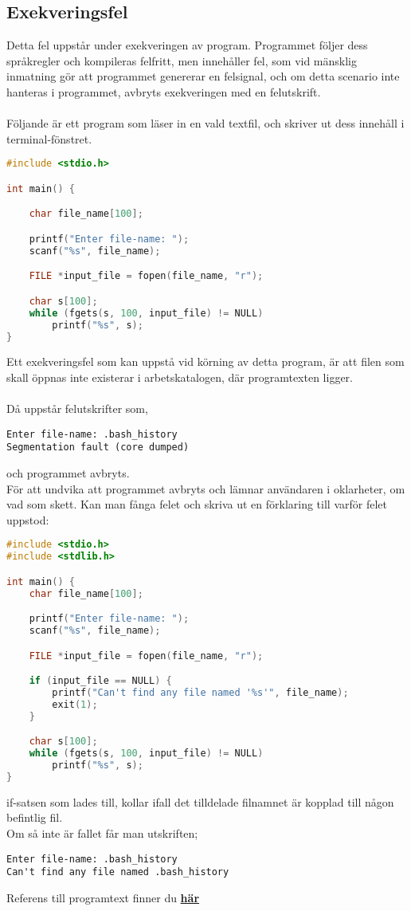 \documentclass[../main.tex]{subfiles}
\begin{document}
\subsection{Exekveringsfel}
\label{sec:c3}
Detta fel uppstår under exekveringen av program. Programmet följer dess språkregler och kompileras felfritt, men innehåller fel, som vid mänsklig inmatning gör att programmet genererar en felsignal, och om detta scenario inte hanteras i programmet, avbryts exekveringen med en felutskrift.\\
\\
Följande är ett program som läser in en vald textfil, och skriver ut dess innehåll i terminal-fönstret.
\begin{lstlisting}[language=c]
#include <stdio.h>

int main() {

    char file_name[100];

    printf("Enter file-name: ");
    scanf("%s", file_name);

    FILE *input_file = fopen(file_name, "r");

    char s[100];
    while (fgets(s, 100, input_file) != NULL)
        printf("%s", s);
}
\end{lstlisting}
Ett exekveringsfel som kan uppstå vid körning av detta program, är att filen som skall öppnas inte existerar i arbetskatalogen, där programtexten ligger.\\
\\
Då uppstår felutskrifter som,
\begin{lstlisting}
Enter file-name: .bash_history
Segmentation fault (core dumped)
\end{lstlisting}
och programmet avbryts.
\\
För att undvika att programmet avbryts och lämnar användaren i oklarheter, om vad som skett.
Kan man fånga felet och skriva ut en förklaring till varför felet uppstod:

\newpage

\begin{lstlisting}[language=c]
#include <stdio.h>
#include <stdlib.h>

int main() {
    char file_name[100];

    printf("Enter file-name: ");
    scanf("%s", file_name);

    FILE *input_file = fopen(file_name, "r");

    if (input_file == NULL) {
        printf("Can't find any file named '%s'", file_name);
        exit(1);
    }

    char s[100];
    while (fgets(s, 100, input_file) != NULL)
        printf("%s", s);
}
\end{lstlisting}
if-satsen som lades till, kollar ifall det tilldelade filnamnet är kopplad till någon befintlig fil.\\
Om så inte är fallet får man utskriften;
\begin{lstlisting}
Enter file-name: .bash_history
Can't find any file named .bash_history
\end{lstlisting}

\begin{tcolorbox}[colback=green!5!white,colframe=green!75!black]
Referens till programtext finner du \hyperref[sec:exec]{\textbf{här}}
\end{tcolorbox}
\end{document}
